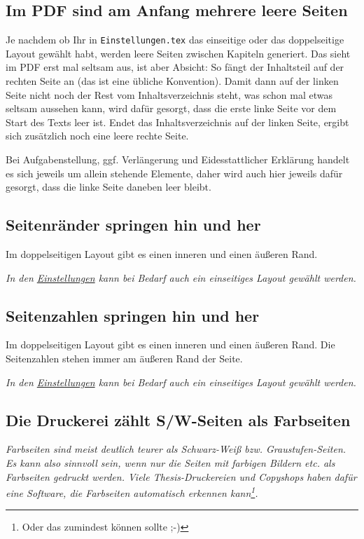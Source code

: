 		\subsection{Im PDF sind am Anfang mehrere leere Seiten}
			Je nachdem ob Ihr in \lstinline|Einstellungen.tex| das einseitige oder das doppelseitige Layout gewählt habt, werden leere Seiten zwischen Kapiteln generiert.
			Das sieht im PDF erst mal seltsam aus, ist aber Absicht:
			So fängt \zb{} der Inhaltsteil auf der rechten Seite an (das ist eine übliche Konvention).
			Damit dann auf der linken Seite nicht noch der Rest vom Inhaltsverzeichnis steht, was schon mal etwas seltsam aussehen kann, wird dafür gesorgt, dass die erste linke Seite vor dem Start des Texts leer ist. Endet das Inhaltsverzeichnis auf der linken Seite, ergibt sich zusätzlich noch eine leere rechte Seite.
			
			Bei Aufgabenstellung, ggf. Verlängerung und Eidesstattlicher Erklärung handelt es sich jeweils um allein stehende Elemente, daher wird auch hier jeweils dafür gesorgt, dass die linke Seite daneben leer bleibt.
		
		\subsection{Seitenränder springen hin und her}
			Im doppelseitigen Layout gibt es einen inneren und einen äußeren Rand.
			\medskip
			
			\textit{In den \hyperref[FAQ:Einstellungen]{Einstellungen} kann bei Bedarf auch ein einseitiges Layout gewählt werden.}
		
		\subsection{Seitenzahlen springen hin und her}
			Im doppelseitigen Layout gibt es einen inneren und einen äußeren Rand.
			Die Seitenzahlen stehen immer am äußeren Rand der Seite.
			\medskip
			
			\textit{In den \hyperref[FAQ:Einstellungen]{Einstellungen} kann bei Bedarf auch ein einseitiges Layout gewählt werden.}
			
		\subsection{Die Druckerei zählt S/W-Seiten als Farbseiten}
			\textit{Farbseiten sind meist deutlich teurer als Schwarz-Weiß bzw. Graustufen-Seiten.
			Es kann also sinnvoll sein, wenn nur die Seiten mit farbigen Bildern etc. als Farbseiten gedruckt werden. Viele Thesis-Druckereien und Copyshops haben dafür eine Software, die Farbseiten automatisch erkennen kann\footnote{Oder das zumindest können sollte ;-)}.}
			
